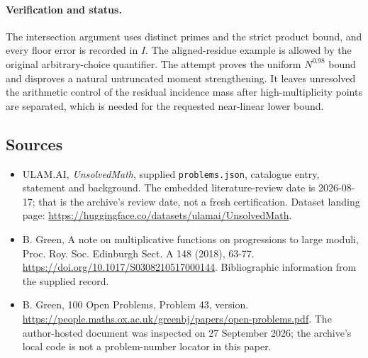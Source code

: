 \documentclass[11pt,a4paper]{article}
\begin{document}
\paragraph{Verification and status.}
The intersection argument uses distinct primes and the strict product bound, and every floor error is recorded in $I$. The aligned-residue example is allowed by the original arbitrary-choice quantifier. The attempt proves the uniform $N^{0.98}$ bound and disproves a natural untruncated moment strengthening. It leaves unresolved the arithmetic control of the residual incidence mass after high-multiplicity points are separated, which is needed for the requested near-linear lower bound.

\subsection{Sources}

{\small

\begin{itemize}

\item[\hypertarget{source:statement:1}{S1}] ULAM.AI, \emph{UnsolvedMath}, supplied \texttt{problems.json}, catalogue entry, statement and background. The embedded literature-review date is 2026-08-17; that is the archive’s review date, not a fresh certification. Dataset landing page: \url{https://huggingface.co/datasets/ulamai/UnsolvedMath}.

\item[\hypertarget{source:statement:2}{S2}] B. Green, A note on multiplicative functions on progressions to large moduli, Proc. Roy. Soc. Edinburgh Sect. A 148 (2018), 63-77. \url{https://doi.org/10.1017/S0308210517000144}. Bibliographic information from the supplied record.

\item[\hypertarget{source:statement:3}{S3}] B. Green, 100 Open Problems, Problem 43, version. \url{https://people.maths.ox.ac.uk/greenbj/papers/open-problems.pdf}. The author-hosted document was inspected on 27 September 2026; the archive’s local code is not a problem-number locator in this paper.

\end{itemize}

}

\label{end:statement}
\end{document}
